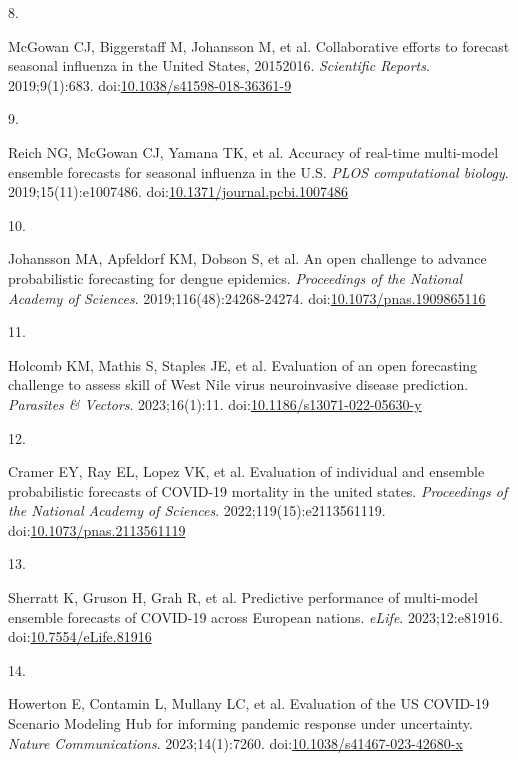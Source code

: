 \documentclass[
  letterpaper,
  DIV=11,
  numbers=noendperiod]{scrartcl}
\newlength{\cslhangindent}
\newlength{\csllabelwidth}
\newenvironment{CSLReferences}[2] %
 {\begin{list}{}{%
  \setlength{\itemindent}{0pt}
  \setlength{\leftmargin}{0pt}
  \setlength{\parsep}{0pt}
  \ifodd #1
   \setlength{\leftmargin}{\cslhangindent}
   \setlength{\itemindent}{-1\cslhangindent}
  \fi
  \setlength{\itemsep}{#2\baselineskip}}}
 {\end{list}}
\newcommand{\CSLLeftMargin}[1]{\parbox[t]{\csllabelwidth}{\strut#1\strut}}
\newcommand{\CSLRightInline}[1]{\parbox[t]{\linewidth - \csllabelwidth}{\strut#1\strut}}
\begin{document}
\begin{CSLReferences}{0}{1}
\CSLLeftMargin{8. }%
\CSLRightInline{McGowan CJ, Biggerstaff M, Johansson M, et al.
Collaborative efforts to forecast seasonal influenza in the United
States, 2015{\textendash}2016. \emph{Scientific Reports}. 2019;9(1):683.
doi:\href{https://doi.org/10.1038/s41598-018-36361-9}{10.1038/s41598-018-36361-9}}

\CSLLeftMargin{9. }%
\CSLRightInline{Reich NG, McGowan CJ, Yamana TK, et al. Accuracy of
real-time multi-model ensemble forecasts for seasonal influenza in the
{U}.{S}. \emph{PLOS computational biology}. 2019;15(11):e1007486.
doi:\href{https://doi.org/10.1371/journal.pcbi.1007486}{10.1371/journal.pcbi.1007486}}

\CSLLeftMargin{10. }%
\CSLRightInline{Johansson MA, Apfeldorf KM, Dobson S, et al. An open
challenge to advance probabilistic forecasting for dengue epidemics.
\emph{Proceedings of the National Academy of Sciences}.
2019;116(48):24268-24274.
doi:\href{https://doi.org/10.1073/pnas.1909865116}{10.1073/pnas.1909865116}}

\CSLLeftMargin{11. }%
\CSLRightInline{Holcomb KM, Mathis S, Staples JE, et al. Evaluation of
an open forecasting challenge to assess skill of {West} {Nile} virus
neuroinvasive disease prediction. \emph{Parasites \& Vectors}.
2023;16(1):11.
doi:\href{https://doi.org/10.1186/s13071-022-05630-y}{10.1186/s13071-022-05630-y}}

\CSLLeftMargin{12. }%
\CSLRightInline{Cramer EY, Ray EL, Lopez VK, et al. Evaluation of
individual and ensemble probabilistic forecasts of COVID-19 mortality in
the united states. \emph{Proceedings of the National Academy of
Sciences}. 2022;119(15):e2113561119.
doi:\href{https://doi.org/10.1073/pnas.2113561119}{10.1073/pnas.2113561119}}

\CSLLeftMargin{13. }%
\CSLRightInline{Sherratt K, Gruson H, Grah R, et al. Predictive
performance of multi-model ensemble forecasts of {COVID}-19 across
{European} nations. \emph{eLife}. 2023;12:e81916.
doi:\href{https://doi.org/10.7554/eLife.81916}{10.7554/eLife.81916}}

\CSLLeftMargin{14. }%
\CSLRightInline{Howerton E, Contamin L, Mullany LC, et al. Evaluation of
the {US} {COVID}-19 {Scenario} {Modeling} {Hub} for informing pandemic
response under uncertainty. \emph{Nature Communications}.
2023;14(1):7260.
doi:\href{https://doi.org/10.1038/s41467-023-42680-x}{10.1038/s41467-023-42680-x}}


\end{CSLReferences}
\end{document}
